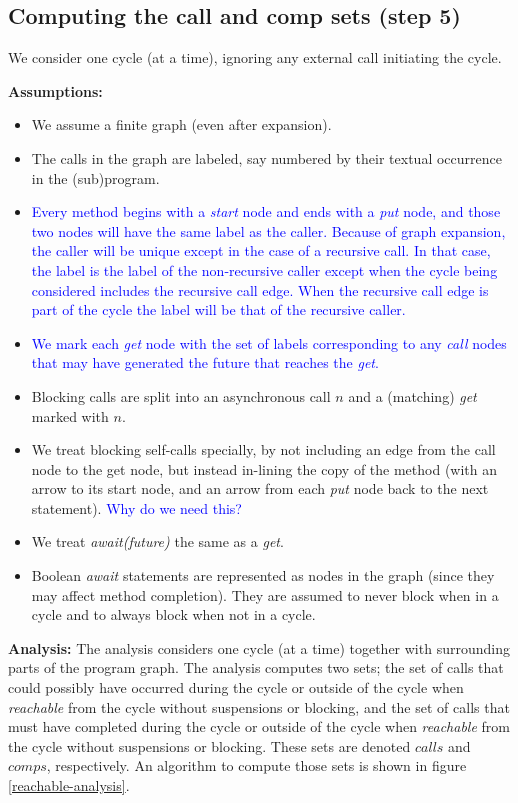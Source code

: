 \documentclass[12pt]{article}%
\newcommand{\Blue}[1] {\textcolor{blue}{#1}}%
\begin{document}
\subsection{Computing the call and comp sets (step 5)}
 We consider one cycle (at a time),
ignoring any external call initiating the cycle.

\noindent\textbf{Assumptions:}

\begin{itemize}

\item
We assume a finite graph (even after expansion).
\item
The calls in the graph are labeled, 
say numbered by their textual occurrence in the (sub)program.
\item 
\Blue{Every method begins with a \emph{start} node and ends with a \emph{put} node, and those two nodes
will have the same label as the caller. Because of graph expansion, the caller will be unique except
in the case of a recursive call. In that case, the label is the label of the non-recursive caller except when
the cycle being considered includes the recursive call edge.
When the recursive call edge is part of the cycle the label will be that of the recursive caller.}
\item
\Blue{We mark each \emph{get} node with the set of labels corresponding to any \emph{call} nodes that may have
generated the future that reaches the \emph{get}.}
\item
Blocking calls are split into an asynchronous call $n$ and a (matching) \emph{get}
marked with  $n$.
\item
We treat blocking self-calls specially,
by not including an edge from the call node to the get node,
but instead  in-lining  the copy of the method
 (with an arrow to its
start node, and an arrow from each  \emph{put} node
back to the next statement). \Blue{Why do we need this?}
\item We treat \emph{await(future)} the same as a \emph{get}.
\item
Boolean \emph{await} statements are represented as nodes in the graph
(since they may affect method completion). They are assumed to never block when in a cycle and to
always block when not in a cycle.

\end{itemize}
\textbf{Analysis:}
The analysis considers one cycle (at a time)
together with surrounding parts of the program graph.
The analysis computes two sets; the set of calls that could possibly have occurred during 
the cycle or outside of the cycle when \emph{reachable} from the cycle without suspensions or blocking,
and the set of calls that must have completed during
the cycle or outside of the cycle when \emph{reachable} from the cycle without suspensions or blocking.
These sets are denoted $calls$ and $comps$, respectively. An algorithm to compute those sets is shown in
figure \ref{reachable-analysis}.
\end{document}
